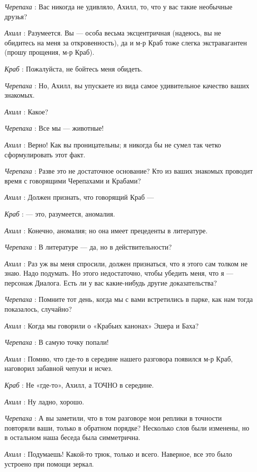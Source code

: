 \emph{Черепаха} : Вас никогда не удивляло, Ахилл, то, что у вас такие необычные друзья?

\emph{Ахилл} : Разумеется. Вы --- особа весьма эксцентричная (надеюсь, вы не обидитесь на меня за откровенность), да и м-р Краб тоже слегка экстравагантен (прошу прощения, м-р Краб).

\emph{Краб} : Пожалуйста, не бойтесь меня обидеть.

\emph{Черепаха} : Но, Ахилл, вы упускаете из вида самое удивительное качество ваших знакомых.

\emph{Ахилл} : Какое?

\emph{Черепаха} : Все мы --- животные!

\emph{Ахилл} : Верно! Как вы проницательны; я никогда бы не сумел так четко сформулировать этот факт.

\emph{Черепаха} : Разве это не достаточное основание? Кто из ваших знакомых проводит время с говорящими Черепахами и Крабами?

\emph{Ахилл} : Должен признать, что говорящий Краб ---

\emph{Краб} : --- это, разумеется, аномалия.

\emph{Ахилл} : Конечно, аномалия; но она имеет прецеденты в литературе.

\emph{Черепаха} : В литературе --- да, но в действительности?

\emph{Ахилл} : Раз уж вы меня спросили, должен признаться, что я этого сам толком не знаю. Надо подумать. Но этого недостаточно, чтобы убедить меня, что я --- персонаж Диалога. Есть ли у вас какие-нибудь другие доказательства?

\emph{Черепаха} : Помните тот день, когда мы с вами встретились в парке, как нам тогда показалось, случайно?

\emph{Ахилл} : Когда мы говорили о «Крабьих канонах» Эшера и Баха?

\emph{Черепаха} : В самую точку попали!

\emph{Ахилл} : Помню, что где-то в середине нашего разговора появился м-р Краб, наговорил забавной чепухи и исчез.

\emph{Краб} : Не «где-то», Ахилл, а ТОЧНО в середине.

\emph{Ахилл} : Ну ладно, хорошо.

\emph{Черепаха} : А вы заметили, что в том разговоре мои реплики в точности повторяли ваши, только в обратном порядке? Несколько слов были изменены, но в остальном наша беседа была симметрична.

\emph{Ахилл} : Подумаешь! Какой-то трюк, только и всего. Наверное, все это было устроено при помощи зеркал.

